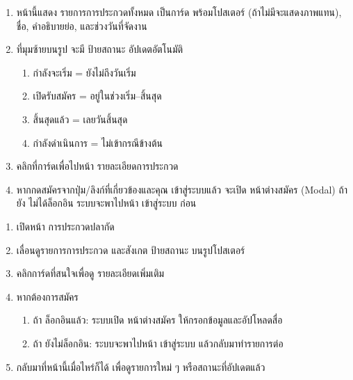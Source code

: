 \par

\begin{sloppypar}
	\begin{enumerate}
		\item หน้านี้แสดง รายการการประกวดทั้งหมด เป็นการ์ด พร้อมโปสเตอร์ (ถ้าไม่มีจะแสดงภาพแทน), ชื่อ, คำอธิบายย่อ, และช่วงวันที่จัดงาน
		\item ที่มุมซ้ายบนรูป จะมี ป้ายสถานะ อัปเดตอัตโนมัติ
		\begin{enumerate}
			\item กำลังจะเริ่ม = ยังไม่ถึงวันเริ่ม
			\item เปิดรับสมัคร = อยู่ในช่วงเริ่ม–สิ้นสุด
			\item สิ้นสุดแล้ว = เลยวันสิ้นสุด
			\item กำลังดำเนินการ = ไม่เข้ากรณีข้างต้น
		\end{enumerate}
		\item คลิกที่การ์ดเพื่อไปหน้า รายละเอียดการประกวด
		\item หากกดสมัครจากปุ่ม/ลิงก์ที่เกี่ยวข้องและคุณ เข้าสู่ระบบแล้ว จะเปิด หน้าต่างสมัคร (Modal) ถ้ายัง ไม่ได้ล็อกอิน ระบบจะพาไปหน้า เข้าสู่ระบบ ก่อน
	\end{enumerate}
\end{sloppypar}

\par

\begin{sloppypar}
	\begin{enumerate}
		\item เปิดหน้า การประกวดปลากัด
		\item เลื่อนดูรายการการประกวด และสังเกต ป้ายสถานะ บนรูปโปสเตอร์
		\item คลิกการ์ดที่สนใจเพื่อดู รายละเอียดเพิ่มเติม
		\item หากต้องการสมัคร
		\begin{enumerate}
			\item ถ้า ล็อกอินแล้ว: ระบบเปิด หน้าต่างสมัคร ให้กรอกข้อมูลและอัปโหลดสื่อ
			\item ถ้า ยังไม่ล็อกอิน: ระบบจะพาไปหน้า เข้าสู่ระบบ แล้วกลับมาทำรายการต่อ
		\end{enumerate}
		\item กลับมาที่หน้านี้เมื่อไหร่ก็ได้ เพื่อดูรายการใหม่ ๆ หรือสถานะที่อัปเดตแล้ว
	\end{enumerate}
\end{sloppypar}

